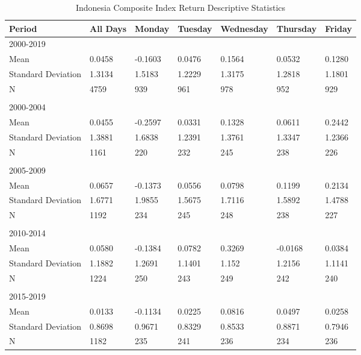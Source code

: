\bigskip
\begin{table}[ht]\centering
  \label{tab:summary_stat} 
  \vspace*{-\baselineskip} %
\begin{minipage}{16.2cm}
\caption{Indonesia Composite Index Return Descriptive Statistics} 
 \small
  \vspace*{-\baselineskip} %
\begin{tabular*}{\textwidth}{@{}l @{\extracolsep{\fill}} llllll@{}}
\toprule
\textbf{Period}           & All Days & Monday  & Tuesday & Wednesday & Thursday & Friday \\
\midrule
2000-2019\\
\quad Mean               & 0.0458   & -0.1603 & 0.0476  & 0.1564   & 0.0532   & 0.1280 \\
\quad Standard Deviation & 1.3134   & 1.5183  & 1.2229  & 1.3175   & 1.2818   & 1.1801 \\
\quad N                  & 4759     & 939     & 961     & 978      & 952      & 929   \\
\\
2000-2004\\
\quad Mean               & 0.0455   & -0.2597 & 0.0331  & 0.1328   & 0.0611   & 0.2442 \\
\quad Standard Deviation & 1.3881   & 1.6838  & 1.2391  & 1.3761   & 1.3347   & 1.2366 \\
\quad N                  & 1161     & 220     & 232     & 245      & 238      & 226    \\
\\
2005-2009\\
\quad Mean               & 0.0657   & -0.1373 & 0.0556  & 0.0798   & 0.1199   & 0.2134 \\
\quad Standard Deviation & 1.6771   & 1.9855  & 1.5675  & 1.7116   & 1.5892   & 1.4788 \\
\quad N                  & 1192     & 234     & 245     & 248      & 238      & 227    \\
\\
2010-2014\\
\quad Mean               & 0.0580   & -0.1384 & 0.0782  & 0.3269   & -0.0168  & 0.0384 \\
\quad Standard Deviation & 1.1882   & 1.2691  & 1.1401  & 1.152    & 1.2156   & 1.1141 \\
\quad N                  & 1224     & 250     & 243     & 249      & 242      & 240    \\
\\
2015-2019\\
\quad Mean                & 0.0133   & -0.1134 & 0.0225  & 0.0816   & 0.0497   & 0.0258 \\
\quad Standard Deviation & 0.8698   & 0.9671  & 0.8329  & 0.8533   & 0.8871   & 0.7946 \\
\quad N                  & 1182     & 235     & 241     & 236      & 234      & 236    \\


\end{tabular*}
\end{minipage}
\end{table}
